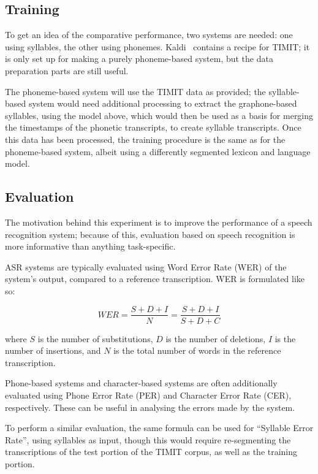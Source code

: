 \documentclass{article}[11pt]
\begin{document}
\subsection{Training}
\label{ssect:train}

To get an idea of the comparative performance, two systems are needed: one using syllables, the other using phonemes. Kaldi~\citep{povey_kaldi_2011} contains a recipe for TIMIT; it is only set up for making a purely phoneme-based system, but the data preparation parts are still useful.

The phoneme-based system will use the TIMIT data as provided; the syllable-based system would need additional processing to extract the graphone-based syllables, using the model above, which would then be used as a basis for merging the timestamps of the phonetic transcripts, to create syllable transcripts. Once this data has been processed, the training procedure is the same as for the phoneme-based system, albeit using a differently segmented lexicon and language model.

\subsection{Evaluation}
\label{ssect:eval}

The motivation behind this experiment is to improve the performance of a speech recognition system; because of this, evaluation based on speech recognition is more informative than anything task-specific.

ASR systems are typically evaluated using Word Error Rate (WER) of the system's output, compared to a reference transcription. WER is formulated like so:

\[ \mathit{WER} = \frac{S+D+I}{N} = \frac{S+D+I}{S+D+C} \]

where $S$ is the number of substitutions, $D$ is the number of deletions, $I$ is the number of insertions, and $N$ is the total number of words in the reference transcription. 

Phone-based systems and character-based systems are often additionally evaluated using Phone Error Rate (PER) and Character Error Rate (CER), respectively. These can be useful in analysing the errors made by the system.

To perform a similar evaluation, the same formula can be used for ``Syllable Error Rate'', using syllables as input, though this would require re-segmenting the transcriptions of the test portion of the TIMIT corpus, as well as the training portion.
\end{document}
